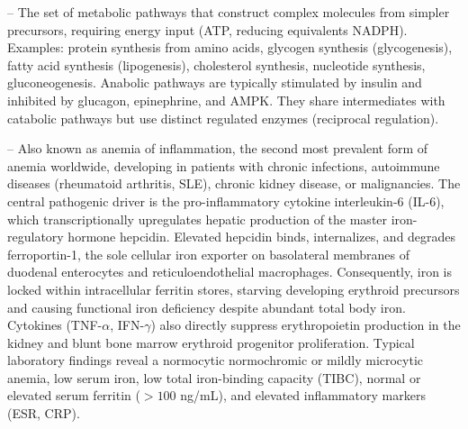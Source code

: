 -- The set of metabolic pathways that construct complex molecules from simpler precursors, requiring energy input (ATP, reducing equivalents NADPH). Examples: protein synthesis from amino acids, glycogen synthesis (glycogenesis), fatty acid synthesis (lipogenesis), cholesterol synthesis, nucleotide synthesis, gluconeogenesis. Anabolic pathways are typically stimulated by insulin and inhibited by glucagon, epinephrine, and AMPK. They share intermediates with catabolic pathways but use distinct regulated enzymes (reciprocal regulation).

-- Also known as anemia of inflammation, the second most prevalent form of anemia worldwide, developing in patients with chronic infections, autoimmune diseases (rheumatoid arthritis, SLE), chronic kidney disease, or malignancies. The central pathogenic driver is the pro-inflammatory cytokine interleukin-6 (IL-6), which transcriptionally upregulates hepatic production of the master iron-regulatory hormone hepcidin. Elevated hepcidin binds, internalizes, and degrades ferroportin-1, the sole cellular iron exporter on basolateral membranes of duodenal enterocytes and reticuloendothelial macrophages. Consequently, iron is locked within intracellular ferritin stores, starving developing erythroid precursors and causing functional iron deficiency despite abundant total body iron. Cytokines (TNF-$\alpha$, IFN-$\gamma$) also directly suppress erythropoietin production in the kidney and blunt bone marrow erythroid progenitor proliferation. Typical laboratory findings reveal a normocytic normochromic or mildly microcytic anemia, low serum iron, low total iron-binding capacity (TIBC), normal or elevated serum ferritin ($>100$ ng/mL), and elevated inflammatory markers (ESR, CRP).

